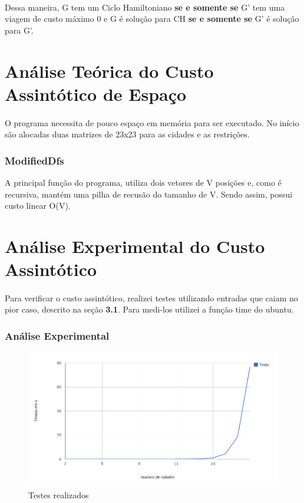 \documentclass[a4paper, 12pt]{article}
\begin{document}
\paragraph{}
Dessa maneira, G tem um Ciclo Hamiltoniano \textbf{se e somente se} G' tem uma viagem de custo máximo 0 e G é solução para CH \textbf{se e somente se} G' é solução para G'.

\section{Análise Teórica do Custo Assintótico de Espaço}
\paragraph{}
O programa necessita de pouco espaço em memória para ser executado.
No início são alocadas duas matrizes de 23x23 para as cidades e as restrições.

\subsubsection{ModifiedDfs}
A principal função do programa, utiliza dois vetores de V posições e, como é recursiva, mantém uma pilha de recusão do tamanho de V. Sendo assim, possui custo linear O(V).

\section{Análise Experimental do Custo Assintótico}
\paragraph{}
Para verificar o custo assintótico, realizei testes utilizando entradas que caiam no pior caso, descrito na seção \textbf{3.1}. Para medi-los utilizei a função time do ubuntu.
\subsubsection{Análise Experimental}
\begin{figure}[!h]
\centering
\includegraphics[scale=0.4]{analise.png}
\caption{Testes realizados}
\end{figure}
\end{document}
